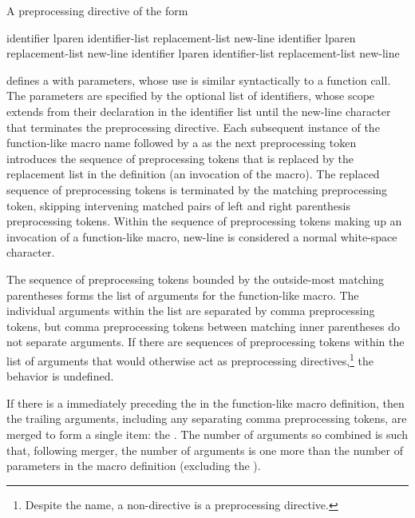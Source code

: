 \pnum
A preprocessing directive of the form

\begin{ncsimplebnf}
 identifier lparen identifier-list\opt \terminal{)} replacement-list new-line\br
{} identifier lparen  \terminal{)} replacement-list new-line\br
{} identifier lparen identifier-list  \terminal{)} replacement-list new-line\br
\end{ncsimplebnf}

%
defines a 
with parameters, whose use is
similar syntactically to a function call.
The parameters
%
are specified by the optional list of identifiers,
whose scope extends from their declaration in the identifier list
until the new-line character that terminates the
preprocessing directive.
Each subsequent instance of the function-like macro name followed by a
\tcode{(}
as the next preprocessing token
introduces the sequence of preprocessing tokens that is replaced
by the replacement list in the definition
(an invocation of the macro).
%
The replaced sequence of preprocessing tokens is terminated by the matching
\tcode{)}
preprocessing token, skipping intervening matched pairs of left and
right parenthesis preprocessing tokens.
Within the sequence of preprocessing tokens making up an invocation
of a function-like macro,
new-line is considered a normal white-space character.

\pnum
{}%
The sequence of preprocessing tokens
bounded by the outside-most matching parentheses
forms the list of arguments for the function-like macro.
The individual arguments within the list
are separated by comma preprocessing tokens,
but comma preprocessing tokens between matching
inner parentheses do not separate arguments.
If there are sequences of preprocessing tokens within the list of
arguments that would otherwise act as preprocessing directives,\footnote{Despite the name, a non-directive is a preprocessing directive.}
the behavior is undefined.

\pnum
{}%
If there is a  immediately preceding the \tcode{)} in the
function-like macro
definition, then the trailing arguments, including any separating comma preprocessing
tokens, are merged to form a single item: the . The number of
arguments so combined is such that, following merger, the number of arguments is
one more than the number of parameters in the macro definition (excluding the
).

